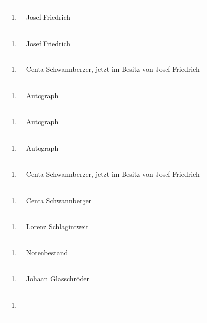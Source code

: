 \documentclass[a4paper]{article}
\begin{document}
\begin{flushleft}
\begin{supertabular}{m{1.2409999cm}m{14.604cm}}
\begin{enumerate}
\item
\end{enumerate}
 &
Josef Friedrich\\
\begin{enumerate}
\item
\end{enumerate}
 &
Josef Friedrich\\
\begin{enumerate}
\item
\end{enumerate}
 &
Centa Schwannberger, jetzt im Besitz von Josef Friedrich\\
\begin{enumerate}
\item
\end{enumerate}
 &
Autograph\\
\begin{enumerate}
\item
\end{enumerate}
 &
Autograph\\
\begin{enumerate}
\item
\end{enumerate}
 &
Autograph\\
\begin{enumerate}
\item
\end{enumerate}
 &
Centa Schwannberger, jetzt im Besitz von Josef Friedrich\\
\begin{enumerate}
\item
\end{enumerate}
 &
Centa Schwannberger\\
\begin{enumerate}
\item
\end{enumerate}
 &
Lorenz Schlagintweit\\
\begin{enumerate}
\item
\end{enumerate}
 &
Notenbestand\\
\begin{enumerate}
\item
\end{enumerate}
 &
Johann Glasschröder\\
\begin{enumerate}
\item
\end{enumerate}

\end{supertabular}
\end{flushleft}
\end{document}
